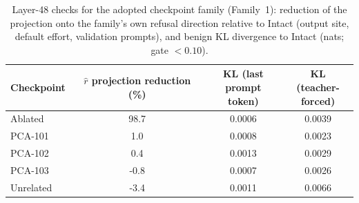 \begin{table}[t]
\centering
\footnotesize
\setlength{\tabcolsep}{4pt}
\caption{Layer-48 checks for the adopted checkpoint family (Family~1): reduction of the projection onto the family's own refusal direction relative to Intact (output site, default effort, validation prompts), and benign KL divergence to Intact (nats; gate $<0.10$).}
\label{tab:projkl}
\begin{tabular}{lccc}
\toprule
Checkpoint & \shortstack{$\hat r$ projection\\reduction (\%)} & \shortstack{KL (last\\prompt token)} & \shortstack{KL (teacher-\\forced)} \\
\midrule
Ablated & 98.7 & 0.0006 & 0.0039 \\
PCA-101 & 1.0 & 0.0008 & 0.0023 \\
PCA-102 & 0.4 & 0.0013 & 0.0029 \\
PCA-103 & -0.8 & 0.0007 & 0.0026 \\
Unrelated & -3.4 & 0.0011 & 0.0066 \\
\bottomrule
\end{tabular}
\end{table}
